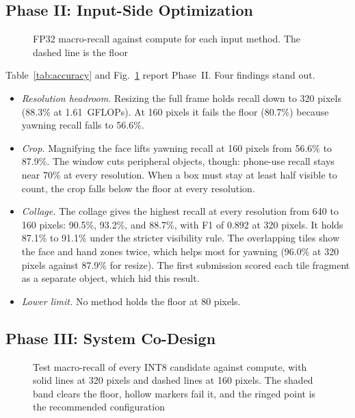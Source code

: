 \documentclass[conference]{IEEEtran}
\begin{document}
\subsection{Phase II: Input-Side Optimization}



\begin{figure}[!t]
\centering

\caption{FP32 macro-recall against compute for each input method. The dashed line is the floor}
\label{fig:input_methods}
\end{figure}

Table~\ref{tab:accuracy} and Fig.~\ref{fig:input_methods} report Phase~II. Four findings stand out.
\begin{itemize}
\item \emph{Resolution headroom.} Resizing the full frame holds recall down to 320 pixels (88.3\% at 1.61~GFLOPs). At 160 pixels it fails the floor (80.7\%) because yawning recall falls to 56.6\%.
\item \emph{Crop.} Magnifying the face lifts yawning recall at 160 pixels from 56.6\% to 87.9\%. The window cuts peripheral objects, though: phone-use recall stays near 70\% at every resolution. When a box must stay at least half visible to count, the crop falls below the floor at every resolution.
\item \emph{Collage.} The collage gives the highest recall at every resolution from 640 to 160 pixels: 90.5\%, 93.2\%, and 88.7\%, with F1 of 0.892 at 320 pixels. It holds 87.1\% to 91.1\% under the stricter visibility rule. The overlapping tiles show the face and hand zones twice, which helps most for yawning (96.0\% at 320 pixels against 87.9\% for resize). The first submission scored each tile fragment as a separate object, which hid this result.
\item \emph{Lower limit.} No method holds the floor at 80 pixels.
\end{itemize}

\subsection{Phase III: System Co-Design}




\begin{figure}[!t]
\centering

\caption{Test macro-recall of every INT8 candidate against compute, with solid lines at 320 pixels and dashed lines at 160 pixels. The shaded band clears the floor, hollow markers fail it, and the ringed point is the recommended configuration}
\label{fig:codesign}
\end{figure}
\end{document}
